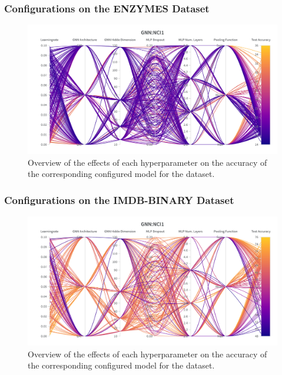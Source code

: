 \subsubsection{\gnn Configurations on the ENZYMES Dataset}
\begin{figure}[H]
    \centering
    \includegraphics[width=\textwidth, trim={0 75 0 150}, clip]{Figures/hyperparameter_gnn_enzymes.png}
    \caption{Overview of the effects of each hyperparameter on the accuracy of the corresponding configured \gnn model for the \enzymes dataset.}
    \label{fig:wandb_gnn_enzymes}
\end{figure}

\subsubsection{\gnn Configurations on the IMDB-BINARY Dataset}
\begin{figure}[H]
    \centering
    \includegraphics[width=\textwidth, trim={0 75 0 150}, clip]{Figures/hyperparameter_gnn_imdb.png}
    \caption{Overview of the effects of each hyperparameter on the accuracy of the corresponding configured \gnn model for the \imdb dataset.}
    \label{fig:wandb_gnn_imdb}
\end{figure}
\clearpage


